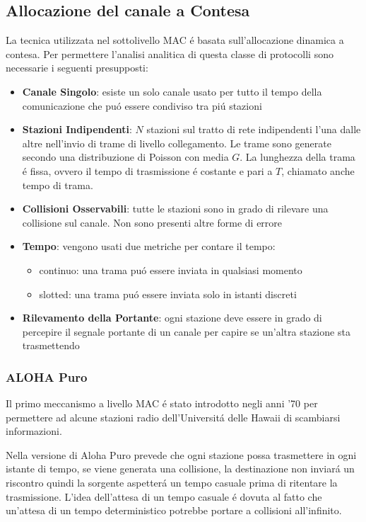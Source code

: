 \documentclass[12pt]{article}
\begin{document}
\subsection{Allocazione del canale a Contesa}\label{mac-allorazione-canale-a-contesa}
La tecnica utilizzata nel sottolivello MAC \'e basata sull'allocazione dinamica a contesa. Per permettere l'analisi analitica 
di questa classe di protocolli sono necessarie i seguenti presupposti:
\begin{itemize}[]
	\item \textbf{Canale Singolo}: esiste un solo canale usato per tutto il tempo della comunicazione che pu\'o essere 
	      condiviso tra pi\'u stazioni
	\item \textbf{Stazioni Indipendenti}: $N$ stazioni sul tratto di rete indipendenti l'una dalle altre nell'invio di trame 
	      di livello collegamento. Le trame sono generate secondo una distribuzione di Poisson con media $G$. 
	      La lunghezza della trama \'e fissa, ovvero il tempo di trasmissione \'e costante e pari a $T$, chiamato anche tempo 
	      di trama.
	\item \textbf{Collisioni Osservabili}: tutte le stazioni sono in grado di rilevare una collisione sul canale. Non sono 
	       presenti altre forme di errore
	\item \textbf{Tempo}: vengono usati due metriche per contare il tempo:
	      \begin{itemize}[noitemsep]
				\item continuo: una trama pu\'o essere inviata in qualsiasi momento
				\item slotted: una trama pu\'o essere inviata solo in istanti discreti
		  \end{itemize}
	\item \textbf{Rilevamento della Portante}: ogni stazione deve essere in grado di percepire il segnale portante di un 
	      canale per capire se un'altra stazione sta trasmettendo
\end{itemize}

\clearpage
\subsubsection{ALOHA Puro} \label{mac-allorazione-canale-a-contesa-aloha-puro}
Il primo meccanismo a livello MAC \'e stato introdotto negli anni '70 per permettere ad alcune 
stazioni radio dell'Universit\'a delle Hawaii di scambiarsi informazioni.

Nella versione di Aloha Puro prevede che ogni stazione possa trasmettere in ogni istante di tempo, se viene generata una 
collisione, la destinazione non inviar\'a un riscontro quindi la sorgente aspetter\'a un tempo casuale prima di 
ritentare la trasmissione. L'idea dell'attesa di un tempo casuale \'e dovuta al fatto che un'attesa di un tempo 
deterministico potrebbe portare a collisioni all'infinito.
\end{document}
